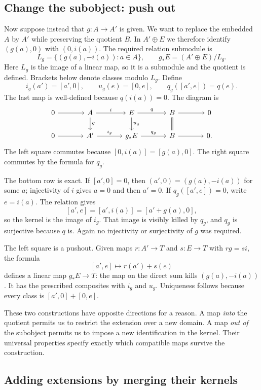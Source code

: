 \documentclass[11pt]{article}
\theoremstyle{definition}
\theoremstyle{remark}\newtheorem{remark}[theorem]{Remark}
\begin{document}
\subsection{Change the subobject: push out}

Now suppose instead that $g:A\to A'$ is given. We want to replace the
embedded $A$ by $A'$ while preserving the quotient $B$. In $A'\oplus E$
we therefore identify $(g(a),0)$ with $(0,i(a))$. The required relation
submodule is
\[
L_g=\{(g(a),-i(a)):a\in A\},
\qquad
g_*E=(A'\oplus E)/L_g.
\]
Here $L_g$ is the image of a linear map, so it is a submodule and the
quotient is defined. Brackets below denote classes modulo $L_g$. Define
\[
i_g(a')=[a',0],\qquad u_g(e)=[0,e],\qquad q_g([a',e])=q(e).
\]
The last map is well-defined because $q(i(a))=0$. The diagram is
\[
\begin{tikzcd}[column sep=large]
0\arrow[r]&A\arrow[r,"i"]\arrow[d,"g"]
 &E\arrow[r,"q"]\arrow[d,"u_g"]&B\arrow[r]\arrow[d,equal]&0\\
0\arrow[r]&A'\arrow[r,"i_g"]&g_*E\arrow[r,"q_g"]&B\arrow[r]&0.
\end{tikzcd}
\]
The left square commutes because $[0,i(a)]=[g(a),0]$. The right square
commutes by the formula for $q_g$.

The bottom row is exact. If $[a',0]=0$, then
$(a',0)=(g(a),-i(a))$ for some $a$; injectivity of $i$ gives $a=0$
and then $a'=0$. If $q_g([a',e])=0$, write $e=i(a)$. The relation gives
\[
[a',e]=[a',i(a)]=[a'+g(a),0],
\]
so the kernel is the image of $i_g$. That image is visibly killed by
$q_g$, and $q_g$ is surjective because $q$ is. Again no injectivity or
surjectivity of $g$ was required.

The left square is a pushout. Given maps $r:A'\to T$ and $s:E\to T$
with $rg=si$, the formula
\[
[a',e]\longmapsto r(a')+s(e)
\]
defines a linear map $g_*E\to T$: the map on the direct sum kills
$(g(a),-i(a))$. It has the prescribed composites with $i_g$ and $u_g$.
Uniqueness follows because every class is $[a',0]+[0,e]$.

These two constructions have opposite directions for a reason. A map
\emph{into} the quotient permits us to restrict the extension over a new
domain. A map \emph{out of} the subobject permits us to impose a new
identification in the kernel. Their universal properties specify exactly
which compatible maps survive the construction.

\subsection{Adding extensions by merging their kernels}
\end{document}
